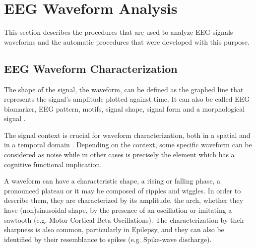 \section{EEG Waveform Analysis}

This section describes the procedures that are used to analyze EEG signals waveforms and the automatic procedures that were developed with this purpose.

\subsection{EEG Waveform Characterization}

The shape of the signal, the waveform, can be defined as the graphed line that represents the signal's amplitude plotted against time. It can also be called EEG biomarker,  EEG pattern, motifs, signal shape, signal form and a morphological signal \cite{Jansen1991}.

The signal context is crucial for waveform characterization, both in a spatial and in a temporal domain \cite{Jansen1991}.  Depending on the context, some specific waveform can be considered as noise while in other cases is precisely the element which has a cognitive functional implication.



%

A waveform can have a characteristic shape, a rising or falling phase, a pronounced plateau or it may be composed of ripples and wiggles. In order to describe them, they are characterized by its amplitude, the arch, whether they have (non)sinusoidal shape, by the presence of an oscillation or imitating a sawtooth (e.g. Motor Cortical Beta Oscillations).  The characterization by their sharpness is also common, particularly in Epilepsy, and they can also be identified by their resemblance to spikes (e.g. Spike-wave discharge).

